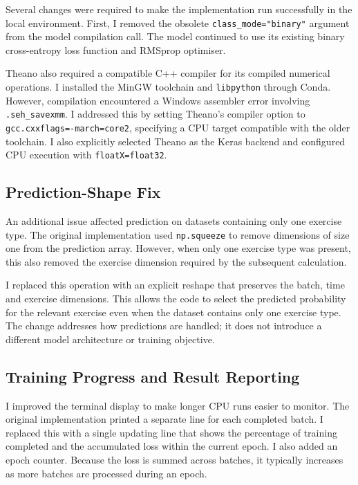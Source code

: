 \documentclass[11pt]{article}
\begin{document}
Several changes were required to make the implementation run successfully in the local environment. First, I removed the obsolete \texttt{class\_mode="binary"} argument from the model compilation call. The model continued to use its existing binary cross-entropy loss function and RMSprop optimiser.

Theano also required a compatible C++ compiler for its compiled numerical operations. I installed the MinGW toolchain and \texttt{libpython} through Conda. However, compilation encountered a Windows assembler error involving \texttt{.seh\_savexmm}. I addressed this by setting Theano's compiler option to \texttt{gcc.cxxflags=-march=core2}, specifying a CPU target compatible with the older toolchain. I also explicitly selected Theano as the Keras backend and configured CPU execution with \texttt{floatX=float32}. 

\subsection{Prediction-Shape Fix}

An additional issue affected prediction on datasets containing only one exercise type. The original implementation used \texttt{np.squeeze} to remove dimensions of size one from the prediction array. However, when only one exercise type was present, this also removed the exercise dimension required by the subsequent calculation.

I replaced this operation with an explicit reshape that preserves the batch, time and exercise dimensions. This allows the code to select the predicted probability for the relevant exercise even when the dataset contains only one exercise type. The change addresses how predictions are handled; it does not introduce a different model architecture or training objective.

\subsection{Training Progress and Result Reporting}

I improved the terminal display to make longer CPU runs easier to
monitor. The original implementation printed a separate line for each
completed batch. I replaced this with a single updating line that shows
the percentage of training completed and the accumulated loss within
the current epoch. I also added an epoch counter. Because the loss is
summed across batches, it typically increases as more batches are
processed during an epoch.
\end{document}
